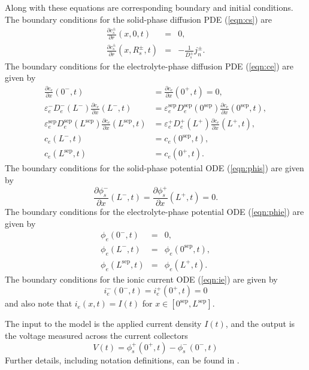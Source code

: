 \documentclass[12pt]{article}
\newcommand{\pard}[2]{\frac{\partial #1}{\partial #2}}
\begin{document}
Along with these equations are corresponding boundary and initial conditions. The boundary conditions for the solid-phase diffusion PDE (\ref{eqn:cs}) are
\begin{eqnarray}
	\frac{\partial c_{s}^{\pm}}{\partial r}(x,0,t) &=& 0, \\
	\frac{\partial c_{s}^{\pm}}{\partial r}(x,R_{s}^{\pm},t) &=& -\frac{1}{D_{s}^{\pm}} j_{n}^{\pm}.
\end{eqnarray}
The boundary conditions for the electrolyte-phase diffusion PDE (\ref{eqn:ce}) are given by
\begin{align}
	\pard{c_{e}}{x}(0^{-},t) &= \pard{c_{e}}{x}(0^{+},t) = 0, \label{eqn:ce-bc1} \\
	\varepsilon_{e}^{-} D_{e}^{-}(L^{-}) \pard{c_{e}}{x}(L^{-},t) &= \varepsilon_{e}^{\textrm{sep}}D_{e}^{\textrm{sep}}(0^{\textrm{sep}}) \pard{c_{e}}{x}(0^{\textrm{sep}},t), \\
	\varepsilon_{e}^{\textrm{sep}}D_{e}^{\textrm{sep}}(L^{\textrm{sep}}) \pard{c_{e}}{x}(L^{\textrm{sep}},t) &= \varepsilon_{e}^{+} D_{e}^{+}(L^{+}) \pard{c_{e}}{x}(L^{+},t), \\
	c_{e}(L^{-},t) &= c_{e}(0^{\textrm{sep}},t), \\
	c_{e}(L^{\textrm{sep}},t) &= c_{e}(0^+,t). \label{eqn:ce-bc5}
\end{align}
The boundary conditions for the solid-phase potential ODE (\ref{eqn:phis}) are given by
\begin{equation}\label{eqn:phis-bc}
	\pard{\phi_{s}^{-}}{x}(L^{-},t) = \pard{\phi_{s}^{+}}{x}(L^{+},t) = 0.
\end{equation}
The boundary conditions for the electrolyte-phase potential ODE (\ref{eqn:phie}) are given by
\begin{eqnarray}
	\phi_{e}(0^{-},t) &=& 0, \\
	\phi_{e}(L^{-},t) &=& \phi_{e}(0^{\textrm{sep}},t), \\
	\phi_{e}(L^{\textrm{sep}},t) &=& \phi_{e}(L^+,t).
\end{eqnarray}
The boundary conditions for the ionic current ODE (\ref{eqn:ie}) are given by
\begin{equation}\label{eqn:ie-bcs}
	i_{e}^{-}(0^{-},t) = i_{e}^{+}(0^+,t) = 0
\end{equation}
and also note that $i_{e}(x,t) = I(t)$ for $x \in [0^{\textrm{sep}}, L^{\textrm{sep}}]$.

The input to the model is the applied current density $I(t)$, and the output is the voltage measured across the current collectors
\begin{equation}\label{eqn:voltage}
	V(t) = \phi^{+}_{s}(0^{+},t) - \phi_{s}^{-}(0^{-},t)
\end{equation}
Further details, including notation definitions, can be found in \cite{Thomas2002,Chaturvedi2010}.
\end{document}
